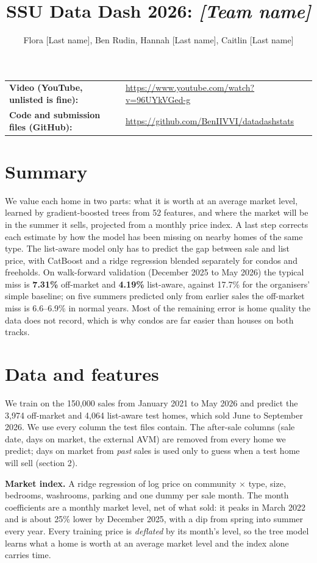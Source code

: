 \documentclass[11pt]{article}
\title{SSU Data Dash 2026: \textit{[Team name]}}
\author{Flora [Last name], Ben Rudin, Hannah [Last name], Caitlin [Last name]}
\date{}
\begin{document}
\maketitle
\vspace{-1.5em}

\noindent\begin{tabular}{@{}ll}
\textbf{Video (YouTube, unlisted is fine):} & \url{https://www.youtube.com/watch?v=96UYkVGed-g} \\
\textbf{Code and submission files (GitHub):} & \url{https://github.com/BenIIVVI/datadashstats} \\
\end{tabular}

\section*{Summary}
We value each home in two parts: what it is worth at an average market level, learned by gradient-boosted
trees from 52 features, and where the market will be in the summer it sells, projected from a monthly price
index. A last step corrects each estimate by how the model has been missing on nearby homes of the same type.
The list-aware model only has to predict the gap between sale and list price, with CatBoost and a
ridge regression blended separately for condos and freeholds.
On walk-forward validation (December 2025 to May 2026) the typical miss is \textbf{7.31\%} off-market and
\textbf{4.19\%} list-aware, against 17.7\% for the organisers' simple baseline; on five summers predicted
only from earlier sales the off-market miss is 6.6--6.9\% in normal years. Most of the remaining error is
home quality the data does not record, which is why condos are far easier than houses on both tracks.

\section{Data and features}
We train on the 150,000 sales from January 2021 to May 2026 and predict the 3,974 off-market and 4,064
list-aware test homes, which sold June to September 2026. We use every column the test files contain. The
after-sale columns (sale date, days on market, the external AVM) are removed from every home we predict;
days on market from \emph{past} sales is used only to guess when a test home will sell (section 2).

\textbf{Market index.} A ridge regression of log price on community $\times$ type, size, bedrooms,
washrooms, parking and one dummy per sale month. The month coefficients are a monthly market level, net of
what sold: it peaks in March 2022 and is about 25\% lower by December 2025, with a dip from spring into
summer every year. Every training price is \emph{deflated} by its month's level, so the tree model learns
what a home is worth at an average market level and the index alone carries time.
\end{document}
